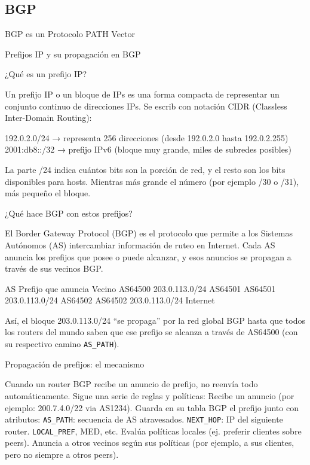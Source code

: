 \subsection{BGP} \label{sec:anexo_bgp}

BGP es un Protocolo PATH Vector


Prefijos IP y su propagación en BGP


¿Qué es un prefijo IP?

Un prefijo IP o un bloque de IPs es una forma compacta de representar un conjunto continuo de direcciones IPs.
Se escrib con notación CIDR (Classless Inter-Domain Routing):

192.0.2.0/24 → representa 256 direcciones (desde 192.0.2.0 hasta 192.0.2.255)
2001:db8::/32 → prefijo IPv6 (bloque muy grande, miles de subredes posibles)

La parte /24 indica cuántos bits son la porción de red, y el resto son los bits disponibles para hosts.
Mientras más grande el número (por ejemplo /30 o /31), más pequeño el bloque.

¿Qué hace BGP con estos prefijos?

El Border Gateway Protocol (BGP) es el protocolo que permite a los Sistemas Autónomos (AS) intercambiar información de ruteo en Internet.
Cada AS anuncia los prefijos que posee o puede alcanzar, y esos anuncios se propagan a través de sus vecinos BGP.


AS
Prefijo que anuncia
Vecino
AS64500
203.0.113.0/24
AS64501
AS64501
203.0.113.0/24
AS64502
AS64502
203.0.113.0/24
Internet



Así, el bloque 203.0.113.0/24 “se propaga” por la red global BGP hasta que todos los routers del mundo saben que ese prefijo se alcanza a través de AS64500 (con su respectivo camino \texttt{AS\_PATH}).

Propagación de prefijos: el mecanismo

Cuando un router BGP recibe un anuncio de prefijo, no reenvía todo automáticamente. 
Sigue una serie de reglas y políticas:
Recibe un anuncio (por ejemplo: 200.7.4.0/22 via AS1234).
Guarda en su tabla BGP el prefijo junto con atributos:
\texttt{AS\_PATH}: secuencia de AS atravesados.
\texttt{NEXT\_HOP}: IP del siguiente router.
\texttt{LOCAL\_PREF}, MED, etc.
Evalúa políticas locales (ej. preferir clientes sobre peers).
Anuncia a otros vecinos según sus políticas (por ejemplo, a sus clientes, pero no siempre a otros peers).







